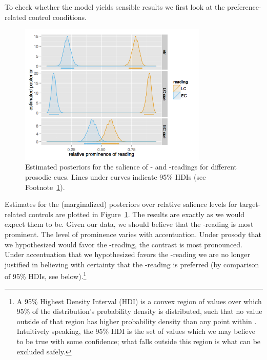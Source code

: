 \documentclass[fleqn,reqno,10pt]{article}
\newcommand{\lc}{\acro{lc}}
\newcommand{\ec}{\acro{ec}}
\begin{document}
To check whether the model yields sensible results we first look at
the preference-related control conditions.
%
\begin{figure}
  \centering
  \includegraphics[width=0.8\textwidth]{pics/post_salience_TF_small.png}
  \caption{Estimated posteriors for the salience of \lc- and
    \ec-readings for different prosodic cues. Lines under curves
    indicate 95\% HDIs (see Footnote~\ref{fn:HDI}).}
  \label{fig:Posterior_TF}
\end{figure}
%
Estimates for the (marginalized) posteriors over relative salience
levels for target-related controls are plotted in
Figure~\ref{fig:Posterior_TF}. The results are exactly as we would
expect them to be. Given our data, we should believe that the
\lc-reading is most prominent. The level of prominence varies with
accentuation. Under prosody that we hypothesized would favor the
\lc-reading, the contrast is most pronounced. Under accentuation that
we hypothesized favors the \ec-reading we are no longer justified in
believing with certainty that the \lc-reading is preferred (by
comparison of 95\% HDIs, see below).\footnote{\label{fn:HDI} A 95\%
  Highest Density Interval (HDI) is a convex region of values over
  which 95\% of the distribution's probability density is distributed,
  such that no value outside of that region has higher probability
  density than any point within
  \citep{Kruschke2011:Doing-Bayesian-}. Intuitively speaking, the 95\%
  HDI is the set of values which we may believe to be true with some
  confidence; what falls outside this region is what can be excluded
  safely.}
\end{document}
